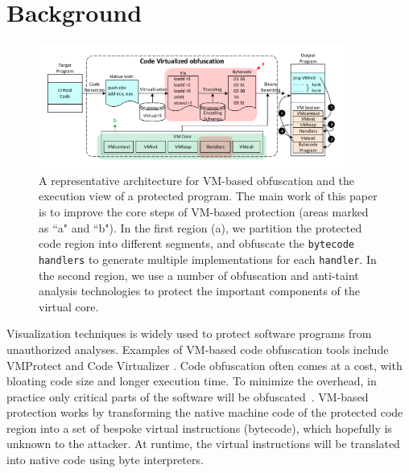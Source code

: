 \section{Background}\label{sec:background}
\begin{figure}[!t]
\centering
\includegraphics[width=0.9\textwidth]{fig/vmprotection.pdf}
\caption{A representative architecture for VM-based obfuscation and the execution view of a protected program. The main work of this paper is to improve the core steps of VM-based protection (areas marked as ``a" and ``b").
In the first region (a), we partition the protected code region into different segments, and obfuscate the \texttt{bytecode handlers} to generate multiple implementations for each \texttt{handler}.
In the second region, we use a number of obfuscation and anti-taint analysis technologies to protect the important components of the virtual core.}
\label{fig:vmprotection}
\end{figure}

Visualization techniques is widely used to protect software programs from unauthorized analyses.
Examples of VM-based code obfuscation tools include VMProtect \cite{vmp} and Code Virtualizer \cite{cv}.
Code obfuscation often comes at a cost, with bloating code size and longer execution time.
To minimize the overhead, in practice only critical parts of the software will be obfuscated~\cite{geneiatakis2012adaptive}.
VM-based  protection works by transforming the native machine code of the protected code region into 
a set of bespoke virtual instructions (bytecode), which hopefully is unknown to the attacker. 
At runtime, the virtual instructions will be translated into native code using byte interpreters.



